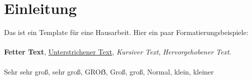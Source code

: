


 




	
	

	\tableofcontents %
	\cleardoubleoddpage
	\section{Einleitung}
		Das ist ein Template für eine Hausarbeit. Hier ein paar Formatierungsbeispiele:\\\\		
		\textbf{Fetter Text}, \underline{Unterstrichener Text}, \textit{Kursiver Text}, \emph{Hervorgehobener Text}.\\\\
		{\Huge Sehr sehr groß}, {\huge sehr groß}, {\LARGE GROẞ}, {\Large Groß}, {\large groß}, {\normalsize Normal}, {\small klein}, {\footnotesize kleiner}
		
